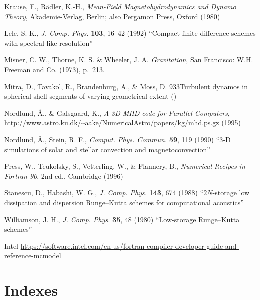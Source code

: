 \documentclass[\mydriver,12pt,twoside,notitlepage,a4paper]{article}
\begin{document}
\begin{thebibliography}{99}
 Krause, F., R\"adler, K.-H.,
  \emph{Mean-Field Magneto\-hy\-dro\-dy\-na\-mics and Dynamo Theory\/},
  Akademie-Verlag, Berlin; also Pergamon Press, Oxford (1980)

Lele, S. K.,
  \emph{J. Comp. Phys.} \textbf{103}, 16--42 (1992)
  ``Compact finite difference schemes with spectral-like resolution''

 Misner, C. W., Thorne, K. S. \& Wheeler, J. A.
  \emph{Gravitation},
  San Francisco: W.H. Freeman and Co. (1973), p.~213.

 Mitra, D., Tavakol, R., Brandenburg, A., \& Moss, D.
{933}{Turbulent dynamos in spherical shell segments of varying geometrical extent} ()

 Nordlund, \AA., \& Galsgaard, K.,
{\it A 3D MHD code for Parallel Computers},
{\url{http://www.astro.ku.dk/~aake/NumericalAstro/papers/kg/mhd.ps.gz}}
(1995)

 Nordlund, \AA., Stein, R. F.,
  \emph{Comput. Phys. Commun.} \textbf{59}, 119 (1990)
  ``3-D simulations of solar and stellar convection and magnetoconvection''

 Press, W., Teukolsky, S., Vetterling, W., \& Flannery, B.,
  \emph{Numerical Recipes in Fortran 90}, 2nd ed., Cambridge (1996)

 Stanescu, D., Habashi, W. G.,
  \emph{J. Comp. Phys.} \textbf{143}, 674 (1988)
  ``$2N$-storage low dissipation and dispersion Runge--Kutta
  schemes for computational acoustics''

 Williamson, J. H.,
  \emph{J. Comp. Phys.} \textbf{35}, 48 (1980)
  ``Low-storage Runge--Kutta schemes''

 Intel \url{https://software.intel.com/en-us/fortran-compiler-developer-guide-and-reference-mcmodel}

\end{thebibliography}


\cleardoublepage

\part{Indexes}
\printindex[file]
\printindex[var]

\ \vfill\bigskip{}
\end{document}
